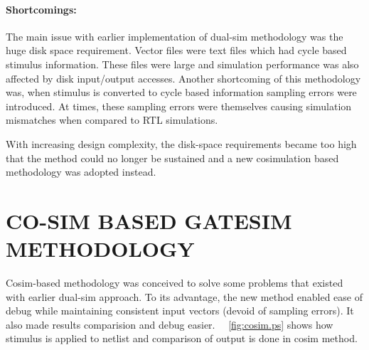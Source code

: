 \paragraph{Shortcomings:}The main issue with earlier implementation of dual-sim methodology was the huge disk space requirement. Vector files were text files which had cycle based stimulus information. These files were large and simulation performance was also affected by disk input/output accesses. Another shortcoming of this methodology was, when stimulus is converted to cycle based information sampling errors were introduced. At times, these sampling errors were themselves causing simulation mismatches when compared to RTL simulations.

 With increasing design complexity, the disk-space requirements became too high that the method could no longer be sustained and a new cosimulation based methodology was adopted instead.





\section{CO-SIM BASED GATESIM METHODOLOGY}
\label{sec:method:csgs}
 Cosim-based methodology was conceived to solve some problems that existed with earlier dual-sim approach. To its advantage, the new method enabled ease of debug while maintaining consistent input vectors (devoid of sampling errors). It also made results comparision and debug easier. ~\figurename{~\ref{fig:cosim.ps}} shows how stimulus is applied to netlist and comparison of output is done in cosim method. %
 
